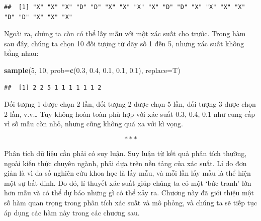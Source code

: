 \documentclass[
]{book}
\newenvironment{Shaded}{\begin{snugshade}}{\end{snugshade}}
\newcommand{\DataTypeTok}[1]{\textcolor[rgb]{0.13,0.29,0.53}{#1}}
\newcommand{\DecValTok}[1]{\textcolor[rgb]{0.00,0.00,0.81}{#1}}
\newcommand{\FloatTok}[1]{\textcolor[rgb]{0.00,0.00,0.81}{#1}}
\newcommand{\KeywordTok}[1]{\textcolor[rgb]{0.13,0.29,0.53}{\textbf{#1}}}
\newcommand{\NormalTok}[1]{#1}
\begin{document}
\begin{verbatim}
##  [1] "X" "X" "X" "D" "D" "X" "X" "X" "X" "D" "D" "X" "X" "X" "X" "D" "D" "X" "X" "X"
\end{verbatim}

Ngoài ra, chúng ta còn có thể lấy mẫu với một xác suất cho trước. Trong hàm sau đây, chúng ta chọn 10 đối tượng từ dãy số 1 đến 5, nhưng xác suất không bằng nhau:

\begin{Shaded}
\begin{Highlighting}[]
\KeywordTok{sample}\NormalTok{(}\DecValTok{5}\NormalTok{, }\DecValTok{10}\NormalTok{, }\DataTypeTok{prob=}\KeywordTok{c}\NormalTok{(}\FloatTok{0.3}\NormalTok{, }\FloatTok{0.4}\NormalTok{, }\FloatTok{0.1}\NormalTok{, }\FloatTok{0.1}\NormalTok{, }\FloatTok{0.1}\NormalTok{), }\DataTypeTok{replace=}\NormalTok{T)}
\end{Highlighting}
\end{Shaded}

\begin{verbatim}
##  [1] 2 2 5 1 1 1 1 1 1 2
\end{verbatim}

Đối tượng 1 được chọn 2 lần, đối tượng 2 được chọn 5 lần, đối tượng 3 được chọn 2 lần, v.v\ldots{} Tuy không hoàn toàn phù hợp với xác suất 0.3, 0.4, 0.1 như cung cấp vì số mẫu còn nhỏ, nhưng cũng không quá xa với kì vọng.

\[***\]

Phân tích dữ liệu cần phải có suy luận. Suy luận từ kết quả phân tích thường, ngoài kiến thức chuyên ngành, phải dựa trên nền tảng của xác suất. Lí do đơn giản là vì đa số nghiên cứu khoa học là lấy mẫu, và mỗi lần lấy mẫu là thể hiện một sự bất định. Do đó, lí thuyết xác suất giúp chúng ta có một `bức tranh' lớn hơn mẫu và có thể dự báo những gì có thể xảy ra. Chương này đã giới thiệu một số hàm quan trọng trong phân tích xác suất và mô phỏng, và chúng ta sẽ tiếp tục áp dụng các hàm này trong các chương sau.

  
\end{document}
